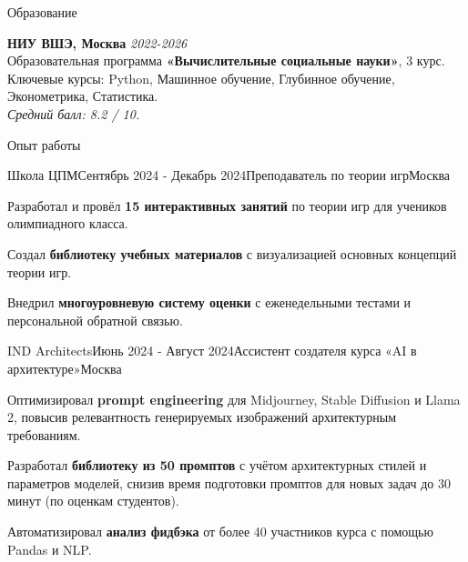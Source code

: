 \documentclass[10pt]{resume} %
\begin{document}
\begin{rSection}{Образование}
	
	\textbf{НИУ ВШЭ, Москва} \hfill \textit{2022-2026} \\ 
	Образовательная программа \textbf{«Вычислительные социальные науки»}, 3 курс. \\
 Ключевые курсы: Python, Машинное обучение, Глубинное обучение, Эконометрика, Статистика. \\
 	\textit{Средний балл: 8.2 / 10.}
	
\end{rSection}


\begin{rSection}{Опыт работы}

\begin{rSubsection}{Школа ЦПМ}{Сентябрь 2024 - Декабрь 2024}{Преподаватель по теории игр}{Москва}
\item Разработал и провёл \textbf{15 интерактивных занятий} по теории игр для учеников олимпиадного класса.
\item Создал \textbf{библиотеку учебных материалов} с визуализацией основных концепций теории игр.
\item Внедрил \textbf{многоуровневую систему оценки} с еженедельными тестами и персональной обратной связью.
\end{rSubsection}

	\begin{rSubsection}{IND Architects}{Июнь 2024 - Август 2024}{Ассистент создателя курса «AI в архитектуре»}{Москва}
		\item  Оптимизировал \textbf{prompt engineering} для Midjourney, Stable Diffusion и Llama 2, повысив релевантность генерируемых изображений архитектурным требованиям.
		\item  Разработал \textbf{библиотеку из 50 промптов} с учётом архитектурных стилей и параметров моделей, снизив время подготовки промптов для новых задач до 30 минут (по оценкам студентов).
  \item Автоматизировал \textbf{анализ фидбэка}  от более 40 участников курса с помощью Pandas и NLP.
	\end{rSubsection}

    
\end{rSection}
\end{document}
